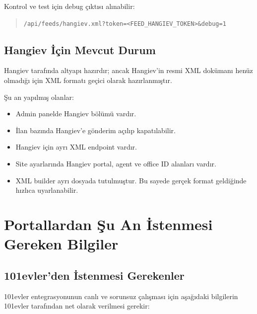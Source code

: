 \documentclass[11pt,a4paper]{article}
\newcommand{\code}[1]{\texttt{#1}}
\begin{document}
Kontrol ve test için debug çıktısı alınabilir:

\begin{quote}
\code{/api/feeds/hangiev.xml?token=<FEED\_HANGIEV\_TOKEN>\&debug=1}
\end{quote}

\subsection{Hangiev İçin Mevcut Durum}

Hangiev tarafında altyapı hazırdır; ancak Hangiev'in resmi XML dokümanı henüz olmadığı için XML formatı geçici olarak hazırlanmıştır.

Şu an yapılmış olanlar:

\begin{itemize}
  \item Admin panelde Hangiev bölümü vardır.
  \item İlan bazında Hangiev'e gönderim açılıp kapatılabilir.
  \item Hangiev için ayrı XML endpoint vardır.
  \item Site ayarlarında Hangiev portal, agent ve office ID alanları vardır.
  \item XML builder ayrı dosyada tutulmuştur. Bu sayede gerçek format geldiğinde hızlıca uyarlanabilir.
\end{itemize}

\section{Portallardan Şu An İstenmesi Gereken Bilgiler}

\subsection{101evler'den İstenmesi Gerekenler}

101evler entegrasyonunun canlı ve sorunsuz çalışması için aşağıdaki bilgilerin 101evler tarafından net olarak verilmesi gerekir:
\end{document}
